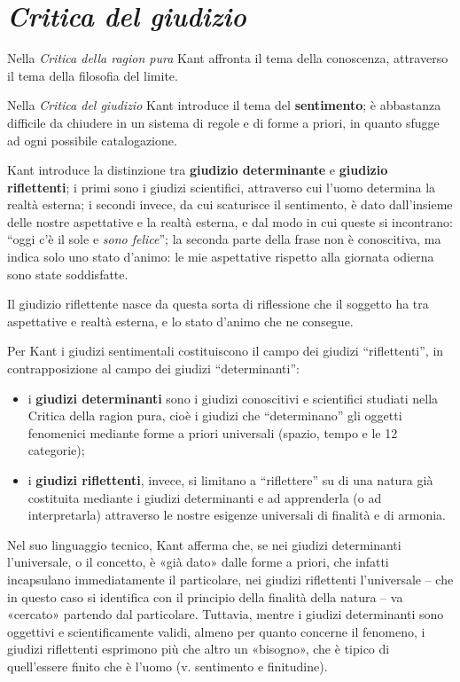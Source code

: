 \documentclass[a4paper, twoside, titlepage]{book}
\begin{document}
\chapter{\textit{Critica del giudizio}}

Nella \textit{Critica della ragion pura} Kant affronta il tema della conoscenza, attraverso il tema della filosofia del limite. 

Nella \textit{Critica del giudizio} Kant introduce il tema del \textbf{sentimento}; è abbastanza difficile da chiudere in un sistema di regole e di forme a priori, in quanto sfugge ad ogni possibile catalogazione.

Kant introduce la distinzione tra \textbf{giudizio determinante} e \textbf{giudizio riflettenti}; i primi sono i giudizi scientifici, attraverso cui l’uomo determina la realtà esterna; i secondi invece, da cui scaturisce il sentimento, è dato dall’insieme delle nostre aspettative e la realtà esterna, e dal modo in cui queste si incontrano: “oggi c’è il sole e \textit{sono felice}”; la seconda parte della frase non è conoscitiva, ma indica solo uno stato d’animo: le mie aspettative rispetto alla giornata odierna sono state soddisfatte.

Il giudizio riflettente nasce da questa sorta di riflessione che il soggetto ha tra aspettative e realtà esterna, e lo stato d’animo che ne consegue.

Per Kant i giudizi sentimentali costituiscono il campo dei giudizi “riflettenti”, in contrapposizione al campo dei giudizi “determinanti”:
\begin{itemize}
\item i \textbf{giudizi determinanti} sono i giudizi conoscitivi e scientifici studiati nella Critica della ragion pura, cioè i giudizi che “determinano” gli oggetti fenomenici mediante forme a priori universali (spazio, tempo e le 12 categorie);
\item i \textbf{giudizi riflettenti}, invece, si limitano a “riflettere” su di una natura già costituita mediante i giudizi determinanti e ad apprenderla (o ad interpretarla) attraverso le nostre esigenze universali di finalità e di armonia.
\end{itemize}

Nel suo linguaggio tecnico, Kant afferma che, se nei giudizi determinanti l’universale, o il concetto, è «già dato» dalle forme a priori, che infatti incapsulano immediatamente il particolare, nei giudizi riflettenti l’universale – che in questo caso si identifica con il principio della finalità della natura – va «cercato» partendo dal particolare. Tuttavia, mentre i giudizi determinanti sono oggettivi e scientificamente validi, almeno per quanto concerne il fenomeno, i giudizi riflettenti esprimono più che altro un «bisogno», che è tipico di quell’essere finito che è l’uomo (v. sentimento e finitudine).
\end{document}
